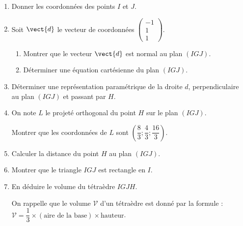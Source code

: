 \begin{enumerate}
	\item Donner les coordonnées des points $I$ et $J$.
	\item Soit $\vect{d}$ le vecteur de coordonnées $\begin{pmatrix} -1\\1\\1 \end{pmatrix}$.
	\begin{enumerate}
		\item Montrer que le vecteur $\vect{d}$ est normal au plan $(IGJ)$.
		\item Déterminer une équation cartésienne du plan $(IGJ)$.
	\end{enumerate}
	\item Déterminer une représentation paramétrique de la droite $d$, perpendiculaire au plan 
	$(IGJ)$ et passant par $H$.
	\item On note $L$ le projeté orthogonal du point $H$ sur le plan $(IGJ)$.
	
	Montrer que les coordonnées de $L$ sont $\left( \dfrac83 ; \dfrac{4}{3} ; \dfrac{16}{3} \right)$.
	\item Calculer la distance du point $H$ au plan $(IGJ)$.
	\item Montrer que le triangle $IGJ$ est rectangle en $I$.
	\item En déduire le volume du tétraèdre $IGJH$.
	
	On rappelle que le volume $\mathcal{V}$ d'un tétraèdre est donné par la formule : $\mathcal{V} = \dfrac13 \times (\text{aire de la base}) \times \text{hauteur}$.
\end{enumerate}
